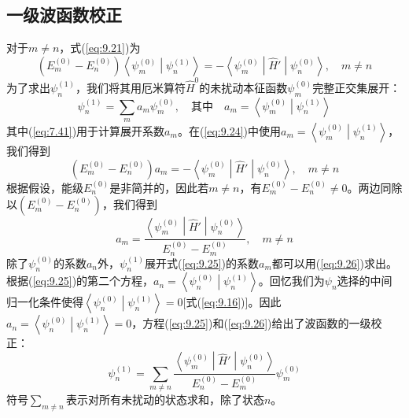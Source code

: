 \subsection*{一级波函数校正}

    对于$m \neq n$，式(\ref{eq:9.21})为
    \begin{equation}
        \left(E_m^{\left(0\right)} - E_n^{\left(0\right)}\right)\left\langle \psi_m^{\left(0\right)} \middle| \psi_n^{\left(1\right)} \right\rangle = - \left\langle \psi_m^{\left(0\right)} \middle| \hat{H}' \middle| \psi_n^{\left(0\right)} \right\rangle, \quad m \neq n
        \label{eq:9.24}
    \end{equation}
    为了求出$\psi_n^{\left(1\right)}$，我们将其用厄米算符$\hat{H}^0$的未扰动本征函数$\psi_m^{\left(0\right)}$完整正交集展开：
    \begin{equation}
        \psi_n^{\left(1\right)} = \sum_{m} a_m \psi_m^{\left(0\right)}, \quad \text{其中} \quad a_m = \left\langle \psi_m^{\left(0\right)} \middle| \psi_n^{\left(1\right)} \right\rangle
        \label{eq:9.25}
    \end{equation}
    其中(\ref{eq:7.41})用于计算展开系数$a_m$。在(\ref{eq:9.24})中使用$a_m = \left\langle \psi_m^{\left(0\right)} \middle| \psi_n^{\left(1\right)} \right\rangle$，我们得到
    \begin{equation*}
        \left(E_m^{\left(0\right)} - E_n^{\left(0\right)}\right)a_m = - \left\langle \psi_m^{\left(0\right)} \middle| \hat{H}' \middle| \psi_n^{\left(0\right)} \right\rangle, \quad m \neq n
    \end{equation*}
    根据假设，能级$E_n^{\left(0\right)}$是非简并的，因此若$m \neq n$，有$E_m^{\left(0\right)} - E_n^{\left(0\right)} \neq 0$。两边同除以$\left(E_m^{\left(0\right)} - E_n^{\left(0\right)}\right)$，我们得到
    \begin{equation}
        a_m = \frac{\left\langle \psi_m^{\left(0\right)} \middle| \hat{H}' \middle| \psi_n^{\left(0\right)} \right\rangle}{E_n^{\left(0\right)} - E_m^{\left(0\right)}}, \quad m \neq n
        \label{eq:9.26}
    \end{equation}
    除了$\psi_n^{\left(0\right)}$的系数$a_n$外，$\psi_n^{\left(1\right)}$展开式(\ref{eq:9.25})的系数$a_m$都可以用(\ref{eq:9.26})求出。根据(\ref{eq:9.25})的第二个方程，$a_n = \left\langle \psi_n^{\left(0\right)} \middle| \psi_n^{\left(1\right)} \right\rangle$。回忆我们为$\psi_n$选择的中间归一化条件使得$\left\langle \psi_n^{\left(0\right)} \middle| \psi_n^{\left(1\right)} \right\rangle = 0$[式(\ref{eq:9.16})]。因此$a_n = \left\langle \psi_n^{\left(0\right)} \middle| \psi_n^{\left(1\right)} \right\rangle = 0$，方程(\ref{eq:9.25})和(\ref{eq:9.26})给出了波函数的一级校正：
    \begin{equation}
        \psi_n^{\left(1\right)} = \sum_{m \neq n} \frac{\left\langle \psi_m^{\left(0\right)} \middle| \hat{H}' \middle| \psi_n^{\left(0\right)} \right\rangle}{E_n^{\left(0\right)} - E_m^{\left(0\right)}} \psi_m^{\left(0\right)}
        \label{eq:9.27}
    \end{equation}
    符号$\sum_{m \neq n}$表示对所有未扰动的状态求和，除了状态$n$。


